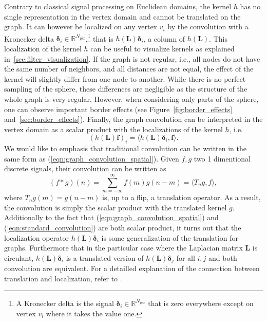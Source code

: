 \documentclass[final,twocolumn,3p,times,authoryear]{elsarticle}
\newcommand{\figref}[1]{Figure~\ref{fig:#1}}
\newcommand{\eqnref}[1]{(\ref{eqn:#1})}
\renewcommand{\b}[1]{{\bm{#1}}}   %
\newcommand{\1}{\b{1}}              %
\newcommand{\0}{\b{0}}              %
\renewcommand{\L}{\b{L}}
\newcommand{\f}{\b{f}}
\newcommand{\R}{\mathbb{R}}
\begin{document}
Contrary to classical signal processing on Euclidean domains, the kernel $h$ has no single representation in the vertex domain and cannot be translated on the graph. It can however be localized on any vertex $v_i$ by the convolution with a Kronecker delta $\b \delta_i \in \R^{N_{pix}}$,\footnote{A Kronecker delta is the signal $\b \delta_i \in \R^{N_{pix}}$ that is zero everywhere except on vertex $v_i$ where it takes the value one.} that is $h(\L) \b \delta_i$, a column of $h(\L)$.
This localization of the kernel $h$ can be useful to visualize kernels as explained in~\ref{sec:filter_visualization}.
If the graph is not regular, i.e., all nodes do not have the same number of neighbors, and all distances are not equal, the effect of the kernel will slightly differ from one node to another. While there is no perfect sampling of the sphere, these differences are negligible as the structure of the whole graph is very regular. However, when considering only parts of the sphere, one can observe important border effects (see \figref{border_effects} and~\ref{sec:border_effects}).
Finally, the graph convolution can be interpreted in the vertex domain as a scalar product with the localizations of the kernel $h$, i.e. 
\begin{equation} \label{eqn:graph_convolution_spatial}
	(h(\L) \f)_i = \langle h(\L) \b \delta_i, \f \rangle.
\end{equation}
We would like to emphasis that traditional convolution can be written in the same form as \eqnref{graph_convolution_spatial}. Given $f,g$ two 1 dimentional discrete signals, their convolution can be written as
\begin{equation} \label{eqn:standard_convolution}
(f \ast g) (n) = \sum_{m=-\infty}^\infty f(m) g(n-m) = \langle T_n g,  f \rangle,
\end{equation}
where $T_n g(m)=g(n-m)$ is, up to a flip, a translation operator. As a result, the convolution is simply the scalar product with the translated kernel $g$.
Additionally to the fact that \eqnref{graph_convolution_spatial} and \eqnref{standard_convolution} are both scalar product, it turns out that the localization operator $h(\L) \b \delta_i$ is some generalization of the translation for graphs. Furthermore that in the particular case where the Laplacian matrix $\L$ is circulant, $h(\L) \b \delta_i$ is a translated version of $h(\L) \b \delta_j$ for all $i,j$ and both convolution are equivalent.
For a detailled explanation of the connection between translation and localization, refer to \citep[Sec 2.2]{perraudin2017stationary}.
\end{document}
